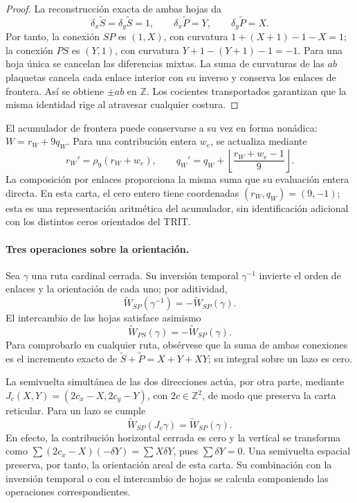 \begin{proof}
La reconstrucción exacta de ambas hojas da
\[
 \delta_x\widetilde S=\delta_y\widetilde S=1,
 \qquad\delta_x\widetilde P=Y,
 \qquad\delta_y\widetilde P=X.
\]
Por tanto, la conexión $SP$ es $(1,X)$, con curvatura
$1+(X+1)-1-X=1$; la conexión $PS$ es $(Y,1)$, con curvatura
$Y+1-(Y+1)-1=-1$. Para una hoja única se cancelan las diferencias
mixtas. La suma de curvaturas de las $ab$ plaquetas cancela cada
enlace interior con su inverso y conserva los enlaces de frontera.
Así se obtiene $\pm ab$ en $\mathbb Z$. Los cocientes transportados
garantizan que la misma identidad rige al atravesar cualquier costura.
\end{proof}

El acumulador de frontera puede conservarse a su vez en forma nonádica:
$W=r_W+9q_W$. Para una contribución entera $w_e$, se actualiza mediante
\[
 r_W'=\rho_9(r_W+w_e),\qquad
 q_W'=q_W+\left\lfloor\frac{r_W+w_e-1}{9}\right\rfloor.
\]
La composición por enlaces proporciona la misma suma que su evaluación
entera directa. En esta carta, el cero entero tiene coordenadas
$(r_W,q_W)=(9,-1)$; esta es una representación aritmética del acumulador,
sin identificación adicional con los distintos ceros orientados del TRIT.

\paragraph{Tres operaciones sobre la orientación.}
Sea $\gamma$ una ruta cardinal cerrada. Su inversión temporal
$\gamma^{-1}$ invierte el orden de enlaces y la orientación de cada uno;
por aditividad,
\[
 \widetilde W_{SP}(\gamma^{-1})=-\widetilde W_{SP}(\gamma).
\]
El intercambio de las hojas satisface asimismo
\[
 \widetilde W_{PS}(\gamma)=-\widetilde W_{SP}(\gamma).
\]
Para comprobarlo en cualquier ruta, obsérvese que la suma de ambas
conexiones es el incremento exacto de
$\widetilde S+\widetilde P=X+Y+XY$; su integral sobre un lazo es cero.

La semivuelta simultánea de las dos direcciones actúa, por otra parte,
mediante $J_c(X,Y)=(2c_x-X,2c_y-Y)$, con $2c\in\mathbb Z^2$,
de modo que preserva la carta reticular. Para un lazo se cumple
\[
 \widetilde W_{SP}(J_c\gamma)=\widetilde W_{SP}(\gamma).
\]
En efecto, la contribución horizontal cerrada es cero y la vertical
se transforma como
$\sum (2c_x-X)(-\delta Y)=\sum X\delta Y$, pues
$\sum\delta Y=0$. Una semivuelta espacial preserva, por tanto, la
orientación areal de esta carta. Su combinación con la inversión temporal
o con el intercambio de hojas se calcula componiendo las operaciones
correspondientes.

